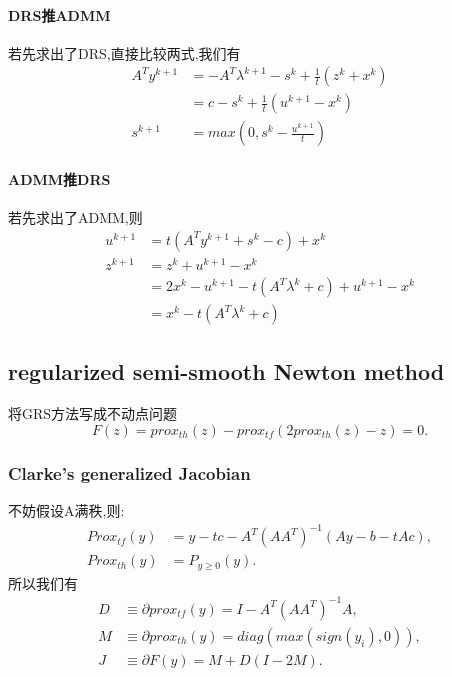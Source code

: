 \documentclass[UTF8]{ctexart}
\begin{document}
\paragraph{DRS推ADMM}
若先求出了DRS,直接比较两式,我们有
\begin{equation}
  \begin{split}
     A^Ty^{k+1}& =-A^T\lambda^{k+1}-s^k+\frac{1}{t}(z^k+x^k)\\
      &= c-s^k+\frac{1}{t}(u^{k+1}-x^k) \\
      s^{k+1}& = max(0,s^k-\frac{u^{k+1}}{t})
  \end{split}
\end{equation}
\paragraph{ADMM推DRS}
若先求出了ADMM,则
\begin{equation}
  \begin{split}
     u^{k+1} &= t(A^Ty^{k+1}+s^k-c)+x^k \\
      z^{k+1} &= z^k+u^{k+1}-x^k\\
              &= 2x^k-u^{k+1}-t(A^T\lambda^k+c) + u^{k+1} -x^{k}\\
              &=x^k - t(A^T\lambda^k+c)
  \end{split}
\end{equation}
\subsection{ regularized semi-smooth Newton method}
将GRS方法写成不动点问题
$$
F(z)=prox_{th}(z)-prox_{tf}(2prox_{th}(z)-z)=0.
$$
\subsubsection{ Clarke’s generalized Jacobian}
不妨假设A满秩,则:
\begin{align*}
  Prox_{tf}(y) &= y-tc-A^T(AA^T)^{-1}(Ay-b-tAc), \\
  Prox_{th}(y) &= P_{y\geq 0}(y).
\end{align*}
所以我们有
\begin{equation}\label{eq:J}
\begin{split}
  D & \equiv \partial prox_{tf}(y) = I-A^T(AA^T)^{-1}A, \\
  M & \equiv \partial prox_{th}(y)= diag(max(sign(y_i),0)),\\
  J &\equiv \partial F(y) = M + D(I-2M).
\end{split}
\end{equation}
\end{document}
